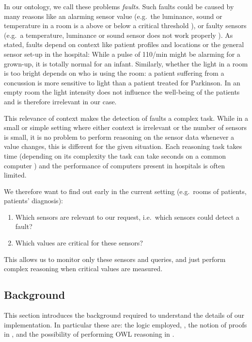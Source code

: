 In our ontology, we call these problems 
 \emph{faults}.  Such faults could be caused by many reasons like an alarming sensor value 
(e.g.\ the luminance, sound or temperature in a room is a above or below a critical threshold
),
or faulty sensors (e.g.\ a temperature, luminance or sound sensor does not work properly
).
As stated, faults depend on context like 
patient profiles and locations or the general sensor set-up in the hospital: 
While a pulse of 110/min might 
be alarming for a grown-up, it is totally normal for an infant. 
Similarly, whether the light in a room is too bright depends on who is using the room: a patient suffering from a concussion is more sensitive to light than a patient 
treated for Parkinson. In an empty room the light intensity does not influence the well-being of the patients and is therefore irrelevant in our case. 

This relevance of context makes the detection of faults a 
complex task. While 
in a small or simple setting where either context 
is irrelevant 
or the number of sensors is small, 
it is no problem to perform reasoning on the sensor data 
whenever a value changes, this is different for the given situation. Each reasoning task takes time 
(depending on its complexity
the task can take seconds on a common computer \cite{arndt_ruleml_industry_2015})
and  %
the performance of computers present 
in  hospitals 
is often limited. 


We therefore want to find out early in the current setting 
(e.g.\ rooms of patients, patients' diagnosis): 
\begin{enumerate}
 \item Which sensors are relevant to our request, i.e.\ which sensors could detect a fault? 
 \item Which values are critical for these sensors?
\end{enumerate}
This allows us to monitor only these sensors and queries, and just perform complex reasoning when critical values are measured. 


\subsection{Background}\label{back}
This section introduces the background required to understand the details of our implementation. In particular these are: the logic employed, \nthree \cite{N3Logic},  
the notion of proofs in \nthree, and
the possibility of performing OWL reasoning in \nthree. 


